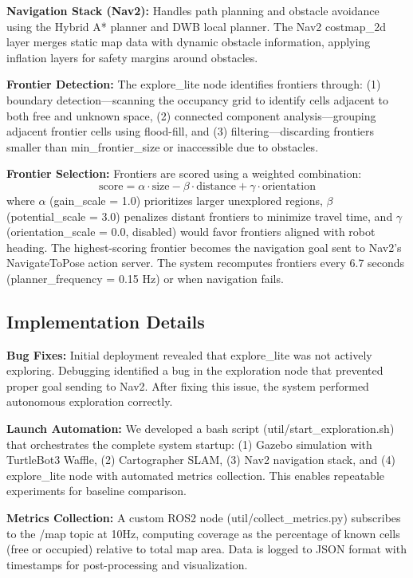\documentclass[conference]{IEEEtran}
\begin{document}
\textbf{Navigation Stack (Nav2):} Handles path planning and obstacle avoidance using the Hybrid A* planner and DWB local planner. The Nav2 costmap\_2d layer merges static map data with dynamic obstacle information, applying inflation layers for safety margins around obstacles.

\textbf{Frontier Detection:} The explore\_lite node identifies frontiers through: (1) boundary detection—scanning the occupancy grid to identify cells adjacent to both free and unknown space, (2) connected component analysis—grouping adjacent frontier cells using flood-fill, and (3) filtering—discarding frontiers smaller than min\_frontier\_size or inaccessible due to obstacles.

\textbf{Frontier Selection:} Frontiers are scored using a weighted combination:
\begin{equation}
    \text{score} = \alpha \cdot \text{size} - \beta \cdot \text{distance} + \gamma \cdot \text{orientation}
\end{equation}
where $\alpha$ (gain\_scale = 1.0) prioritizes larger unexplored regions, $\beta$ (potential\_scale = 3.0) penalizes distant frontiers to minimize travel time, and $\gamma$ (orientation\_scale = 0.0, disabled) would favor frontiers aligned with robot heading. The highest-scoring frontier becomes the navigation goal sent to Nav2's NavigateToPose action server. The system recomputes frontiers every 6.7 seconds (planner\_frequency = 0.15 Hz) or when navigation fails.

\subsection{Implementation Details}

\textbf{Bug Fixes:} Initial deployment revealed that explore\_lite was not actively exploring. Debugging identified a bug in the exploration node that prevented proper goal sending to Nav2. After fixing this issue, the system performed autonomous exploration correctly.

\textbf{Launch Automation:} We developed a bash script (util/start\_exploration.sh) that orchestrates the complete system startup: (1) Gazebo simulation with TurtleBot3 Waffle, (2) Cartographer SLAM, (3) Nav2 navigation stack, and (4) explore\_lite node with automated metrics collection. This enables repeatable experiments for baseline comparison.

\textbf{Metrics Collection:} A custom ROS2 node (util/collect\_metrics.py) subscribes to the /map topic at 10Hz, computing coverage as the percentage of known cells (free or occupied) relative to total map area. Data is logged to JSON format with timestamps for post-processing and visualization.
\end{document}
